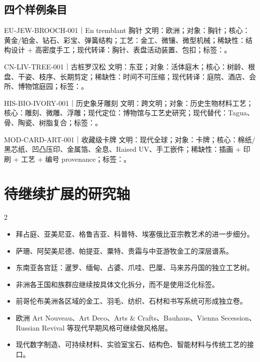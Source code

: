 \documentclass[lang=en,a4paper,11pt]{elegantpaper}
\begin{document}
\subsection{四个样例条目}


\begin{catalogbox}{EU-JEW-BROOCH-001｜En tremblant 胸针}
文明：欧洲；对象：胸针；核心：黄金/铂金、钻石、彩宝、弹簧结构；工艺：金工、微镶、微型机械；稀缺性：结构设计 + 高密度手工；现代转译：胸针、表盘活动装置、包扣；标签：\tagM。
\end{catalogbox}

\begin{catalogbox}{CN-LIV-TREE-001｜古桩罗汉松}
文明：东亚；对象：活体庭木；核心：树龄、根盘、干姿、枝序、长期剪定；稀缺性：时间不可压缩；现代转译：庭院、酒店、会所、博物馆庭园；标签：\tagL。
\end{catalogbox}

\begin{catalogbox}{HIS-BIO-IVORY-001｜历史象牙雕刻}
文明：跨文明；对象：历史生物材料工艺；核心：雕刻、微雕、浮雕；现代定位：博物馆与工艺史研究；现代替代：Tagua、骨、陶瓷、树脂复合；标签：\tagP。
\end{catalogbox}

\begin{catalogbox}{MOD-CARD-ART-001｜收藏级卡牌}
文明：现代全球；对象：卡牌；核心：棉纸/黑芯纸、凹凸压印、金属箔、全息、Raised UV、手工嵌件；稀缺性：插画 + 印刷 + 工艺 + 编号 provenance；标签：\tagM。
\end{catalogbox}

\section{待继续扩展的研究轴}


\begin{multicols}{2}
\begin{itemize}
\item 拜占庭、亚美尼亚、格鲁吉亚、科普特、埃塞俄比亚宗教艺术的进一步细分。
\item 萨珊、阿契美尼德、帕提亚、粟特、贵霜与中亚游牧金工的深层谱系。
\item 东南亚各宫廷：暹罗、缅甸、占婆、爪哇、巴厘、马来苏丹国的独立工艺树。
\item 非洲各王国和族群应继续按具体文化拆分，而不是使用泛化标签。
\item 前哥伦布美洲各区域的金工、羽毛、纺织、石材和书写系统可形成独立卷。
\item 欧洲 Art Nouveau、Art Deco、Arts \& Crafts、Bauhaus、Vienna Secession、Russian Revival 等现代早期风格可继续做风格层。
\item 现代数字制造、可持续材料、实验室宝石、结构色、智能材料与传统工艺的接口。
\end{itemize}
\end{multicols}
\end{document}
